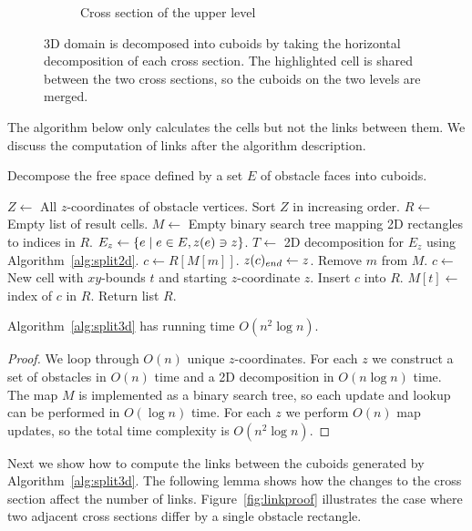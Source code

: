 \documentclass[english,gradu]{tktltiki2018}
\begin{document}
\begin{figure}
\begin{subfigure}[t]{0.3\textwidth}
		\caption{Cross section of the upper level}
	\end{subfigure}
	\caption{3D domain is decomposed into cuboids by taking the horizontal decomposition of each cross section. The highlighted cell is shared between the two cross sections, so the cuboids on the two levels are merged.}\label{fig:split3d}
\end{figure}

The algorithm below only calculates the cells but not the links between them.
We discuss the computation of links after the algorithm description.

\begin{alg}\label{alg:split3d}
Decompose the free space defined by a set $E$ of obstacle faces into cuboids.
\begin{algorithmic}
\State $Z\gets$ All $z$-coordinates of obstacle vertices.
\State Sort $Z$ in increasing order.
\State $R\gets$ Empty list of result cells.
\State $M\gets$ Empty binary search tree mapping 2D rectangles to indices in $R$.
	\State $E_z\gets\left\{e \mid e\in E, z(e)\ni z\right\}$.
	\State $T\gets$ 2D decomposition for $E_z$ using Algorithm~\ref{alg:split2d}.
		\State $c\gets R[M[m]]$.
		\State $z(c)_{end}\gets z$.
		\State Remove $m$ from $M$.
	\EndFor
		\State $c\gets$ New cell with $xy$-bounds $t$ and starting $z$-coordinate $z$.
		\State Insert $c$ into $R$.
		\State $M[t]\gets$ index of $c$ in $R$.
	\EndFor
\EndFor
\State Return list $R$.
\end{algorithmic}
\end{alg}

\begin{lem}\label{lem:split3dtime}Algorithm~\ref{alg:split3d} has running time $O(n^2\log n)$.\end{lem}
\begin{proof}
We loop through $O(n)$ unique $z$-coordinates.
For each $z$ we construct a set of obstacles in $O(n)$ time and a 2D decomposition in $O(n\log n)$ time.
The map $M$ is implemented as a binary search tree, so each update and lookup can be performed in $O(\log n)$ time.
For each $z$ we perform $O(n)$ map updates, so the total time complexity is $O(n^2\log n)$.
\end{proof}

Next we show how to compute the links between the cuboids generated by Algorithm~\ref{alg:split3d}.
The following lemma shows how the changes to the cross section affect the number of links.
Figure~\ref{fig:linkproof} illustrates the case where two adjacent cross sections differ by a single obstacle rectangle.
\end{document}

